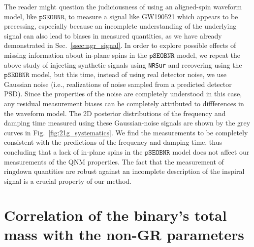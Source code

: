 \documentclass[twocolumn,prd,aps,superscriptaddress,preprintnumbers,tightenlines,showpacs,nofootinbib,eqsecnum,amsfonts,amsmath]{revtex4-1}
\newcommand{\pSEOB}{\texttt{pSEOBNR}}
\begin{document}
The reader might question the judiciousness of using an aligned-spin
waveform model, like $\pSEOB$, to measure a signal like GW190521 which
appears to be precessing, especially because an incomplete
understanding of the underlying signal can also lead to biases in
measured quantities, as we have already demonstrated in
Sec.~\ref{ssec:ngr_signal}. In order to explore possible effects of
missing information about in-plane spins in the $\pSEOB$ model, we repeat the
above study of injecting synthetic signals using \texttt{NRSur}
and recovering using the $\pSEOB$ model, but this time, instead of
using real detector noise, we use Gaussian noise (i.e., realizations
of noise sampled from a predicted detector PSD). Since the properties
of the noise are completely understood in this case, any residual
measurement biases can be completely attributed to diffferences in the
waveform model. The 2D posterior distributions of the frequency and
damping time measured using these Gaussian-noise signals are shown by
the grey curves in Fig.~\ref{fig:21g_systematics}. We find the
measurements to be completely consistent with the predictions of the
frequency and damping time, thus concluding that a lack of in-plane
spins in the $\pSEOB$ model does not affect our measurements of the
QNM properties. The fact that the measurement of ringdown quantities
are robust against an incomplete description of the inspiral signal 
is a crucial property of our method.



\section{Correlation of the binary's total mass with the non-GR parameters}
\label{sec:correlation}
\end{document}
